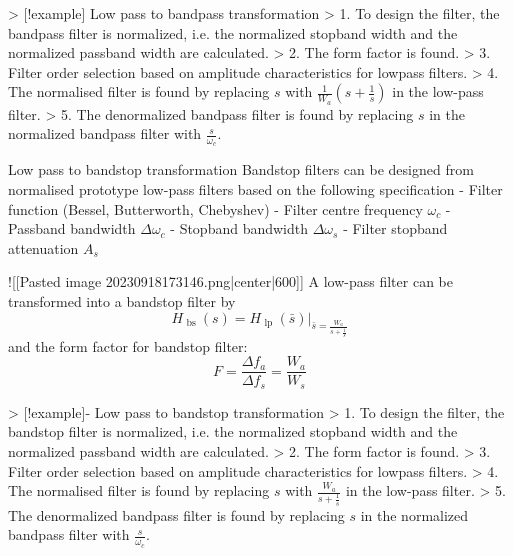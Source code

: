 > [!example] Low pass to bandpass transformation
> 1. To design the filter, the bandpass filter is normalized, i.e. the normalized stopband width and the normalized passband width are calculated.
> 2. The form factor is found.
> 3. Filter order selection based on amplitude characteristics for lowpass filters.
> 4. The normalised filter is found by replacing $s$ with $\frac{1}{W_{a}} \left( s + \frac{1}{s} \right)$ in the low-pass filter.
> 5. The denormalized bandpass filter is found by replacing $s$ in the normalized bandpass filter with $\frac{s}{\omega_{c}}$.

Low pass to bandstop transformation
Bandstop filters can be designed from normalised prototype low-pass filters based on the following specification
- Filter function (Bessel, Butterworth, Chebyshev) 
- Filter centre frequency $\omega_{c}$ 
- Passband bandwidth $\Delta\omega_{c}$ 
- Stopband bandwidth $\Delta\omega_{s}$ 
- Filter stopband attenuation $A_{s}$

![[Pasted image 20230918173146.png|center|600]]
A low-pass filter can be transformed into a bandstop filter by
$$H_{\text{ bs }}(s)=H_{\text{ lp }}(\bar{s})|_{\bar{s}=\frac{W_{a}}{s+\frac{1}{s}}}$$
and the form factor for bandstop filter:
$$F=\frac{\Delta f_{a}}{\Delta f_{s}}=\frac{W_{a}}{W_{s}}$$

> [!example]- Low pass to bandstop transformation
> 1. To design the filter, the bandstop filter is normalized, i.e. the normalized stopband width and the normalized passband width are calculated.
> 2. The form factor is found.
> 3. Filter order selection based on amplitude characteristics for lowpass filters.
> 4. The normalised filter is found by replacing $s$ with $\frac{W_{a}}{s+\frac{1}{s}}$ in the low-pass filter.
> 5. The denormalized bandpass filter is found by replacing $s$ in the normalized bandpass filter with $\frac{s}{\omega_{c}}$.
